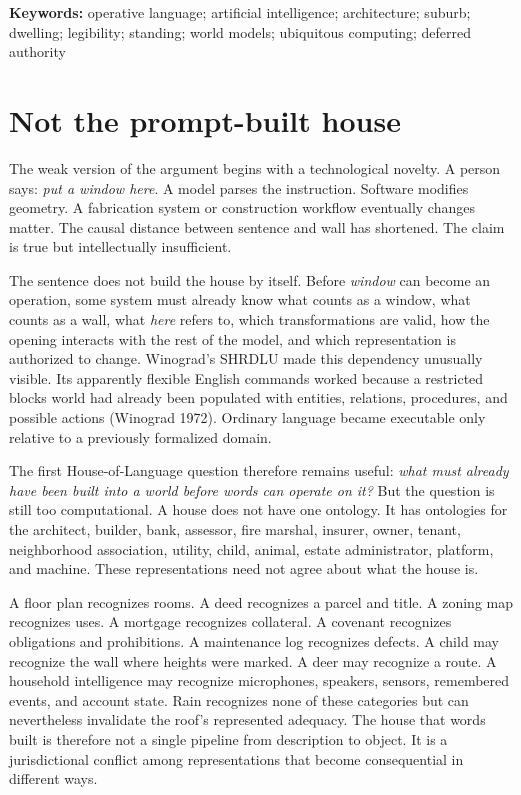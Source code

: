 \documentclass[11pt]{article}
\begin{document}
\noindent\textbf{Keywords:} operative language; artificial intelligence; architecture; suburb; dwelling; legibility; standing; world models; ubiquitous computing; deferred authority

\section{Not the prompt-built house}

The weak version of the argument begins with a technological novelty. A person says: \emph{put a window here}. A model parses the instruction. Software modifies geometry. A fabrication system or construction workflow eventually changes matter. The causal distance between sentence and wall has shortened. The claim is true but intellectually insufficient.

The sentence does not build the house by itself. Before \emph{window} can become an operation, some system must already know what counts as a window, what counts as a wall, what \emph{here} refers to, which transformations are valid, how the opening interacts with the rest of the model, and which representation is authorized to change. Winograd's SHRDLU made this dependency unusually visible. Its apparently flexible English commands worked because a restricted blocks world had already been populated with entities, relations, procedures, and possible actions (Winograd 1972). Ordinary language became executable only relative to a previously formalized domain.

The first House-of-Language question therefore remains useful: \emph{what must already have been built into a world before words can operate on it?} But the question is still too computational. A house does not have one ontology. It has ontologies for the architect, builder, bank, assessor, fire marshal, insurer, owner, tenant, neighborhood association, utility, child, animal, estate administrator, platform, and machine. These representations need not agree about what the house is.

A floor plan recognizes rooms. A deed recognizes a parcel and title. A zoning map recognizes uses. A mortgage recognizes collateral. A covenant recognizes obligations and prohibitions. A maintenance log recognizes defects. A child may recognize the wall where heights were marked. A deer may recognize a route. A household intelligence may recognize microphones, speakers, sensors, remembered events, and account state. Rain recognizes none of these categories but can nevertheless invalidate the roof's represented adequacy. The house that words built is therefore not a single pipeline from description to object. It is a jurisdictional conflict among representations that become consequential in different ways.
\end{document}
